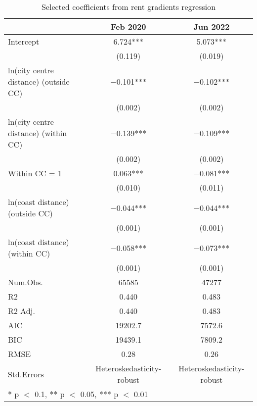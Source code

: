\documentclass[10pt,openany,leqno]{e61-portrait-research-note}
\begin{document}
\begin{table}[ht]
\centering
\caption{Selected coefficients from rent gradients regression}\label{tab:pre-post-regs}
\begin{tabular}{lcc}
\toprule
  & Feb 2020 & Jun 2022\\
\midrule
Intercept & \num{6.724}*** & \num{5.073}***\\
 & (\num{0.119}) & (\num{0.019})\\
ln(city centre distance) (outside CC) & \num{-0.101}*** & \num{-0.102}***\\
 & (\num{0.002}) & \vphantom{1} (\num{0.002})\\
ln(city centre distance) (within CC) & \num{-0.139}*** & \num{-0.109}***\\
 & (\num{0.002}) & (\num{0.002})\\
Within CC = 1 & \num{0.063}*** & \num{-0.081}***\\
 & (\num{0.010}) & (\num{0.011})\\
ln(coast distance) (outside CC) & \num{-0.044}*** & \num{-0.044}***\\
 & (\num{0.001}) & \vphantom{1} (\num{0.001})\\
ln(coast distance) (within CC) & \num{-0.058}*** & \num{-0.073}***\\
 & (\num{0.001}) & (\num{0.001})\\
\midrule
Num.Obs. & \num{65585} & \num{47277}\\
R2 & \num{0.440} & \num{0.483}\\
R2 Adj. & \num{0.440} & \num{0.483}\\
AIC & \num{19202.7} & \num{7572.6}\\
BIC & \num{19439.1} & \num{7809.2}\\
RMSE & \num{0.28} & \num{0.26}\\
Std.Errors & Heteroskedasticity-robust & Heteroskedasticity-robust\\
\bottomrule
\multicolumn{3}{l}{\rule{0pt}{1em}* p $<$ 0.1, ** p $<$ 0.05, *** p $<$ 0.01}\\
\end{tabular}
\end{table}
\end{document}
